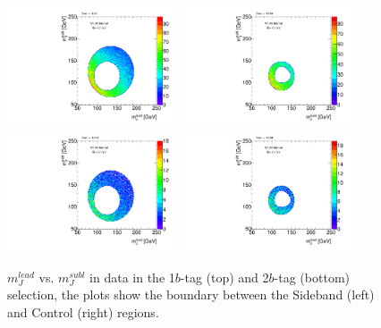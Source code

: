 \begin{figure}[htbp!]
\begin{center}
  \includegraphics[width=0.45\textwidth,angle=-90]{figures/boosted/Other/Sideband_OneTag_mH0H1.pdf}
  \includegraphics[width=0.45\textwidth,angle=-90]{figures/boosted/Other/Control_OneTag_mH0H1.pdf}\\
  \includegraphics[width=0.45\textwidth,angle=-90]{figures/boosted/Other/Sideband_TwoTag_mH0H1.pdf}
  \includegraphics[width=0.45\textwidth,angle=-90]{figures/boosted/Other/Control_TwoTag_mH0H1.pdf}
  \caption{$m_J^{lead}$ vs. $m_J^{subl}$ in data in the 1$b$-tag (top) and 2$b$-tag (bottom) selection, the plots show the boundary between the Sideband (left) and Control (right) regions.}
  \label{fig:boosted-region-def}
\end{center}
\end{figure}

